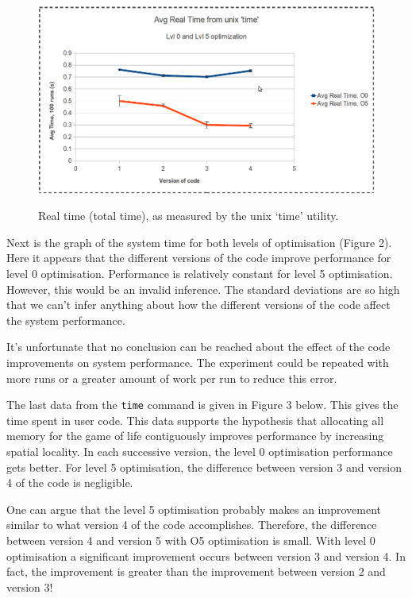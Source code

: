 \documentclass{article}
\begin{document}
\begin{figure}[H] 
\centering
\caption{Real time (total time), as measured by the unix `time' utility.}
\includegraphics[scale=.45]{real_time.png}
\label{}
\end{figure}

Next is the graph of the system time for both levels of optimisation (Figure 2). Here it appears that the different versions of the code improve performance for level 0 optimisation. Performance is relatively constant for level 5 optimisation. However, this would be an invalid inference. The standard deviations are so high that we can't infer anything about how the different versions of the code affect the system performance. 

It's unfortunate that no conclusion can be reached about the effect of the code improvements on system performance. The experiment could be repeated with more runs or a greater amount of work per run to reduce this error. 

The last data from the \verb=time= command is given in Figure 3 below. This gives the time spent in user code. This data supports the hypothesis that allocating all memory for the game of life contiguously improves performance by increasing spatial locality. In each successive version, the level 0 optimisation performance gets better. For level 5 optimisation, the difference between version 3 and version 4 of the code is negligible. 

One can argue that the level 5 optimisation probably makes an improvement similar to what version 4 of the code accomplishes. Therefore, the difference between version 4 and version 5 with O5 optimisation is small. With level 0 optimisation a significant improvement occurs between version 3 and version 4. In fact, the improvement is greater than the improvement between version 2 and version 3!  
\end{document}
